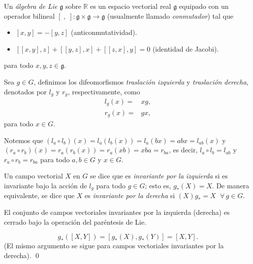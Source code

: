 \begin{mydef}
Un \emph{\'{a}lgebra de Lie} $\mathfrak{g}$ sobre $\mathbb{R}$ es un espacio vectorial real $\mathfrak{g}$ equipado con un operador bilineal $[\;, \;]: \mathfrak{g} \times \mathfrak{g} \rightarrow \mathfrak{g}$ (usualmente llamado \emph{conmutador}) tal que
%
\begin{itemize}
\item{$[x, y] = -[y, z]$ (anticonmutatividad).}
\item{$[[x, y], z] + [[y, z], x] + [[z, x], y] = 0$ (identidad de Jacobi).}
\end{itemize}
%
para todo $x, y, z \in \mathfrak{g}$.
\end{mydef}

\begin{mydef}
Sea $g \in G$, definimos los difeomorfismos \emph{traslaci\'{o}n izquierda} y \emph{traslaci\'{o}n derecha}, denotados por $l_{g}$ y $r_{g}$, respectivamente, como
%
\begin{align*}
l_{g} (x) = & x g, \\
r_{g} (x) = & g x,
\end{align*}
%
para todo $x \in G$.
\end{mydef}

\begin{obs}
Notemos que  $(l_{a} \circ l_{b}) (x) = l_{a} (l_{b} (x)) = l_{a} (bx) = abx = l_{ab} (x)$ y $(r_{a} \circ r_{b}) (x) = r_{a} (r_{b} (x)) = r_{a} (xb) = xba = r_{ba}$, es decir, $l_{a} \circ l_{b} = l_{ab}$ y $r_{a} \circ r_{b} = r_{ba}$ para todo $a, b \in G$ y $x \in G$.
\end{obs}

\begin{mydef}
Un campo vectorial $X$ en $G$ se dice que es \emph{invariante por la izquierda} si es invariante bajo la acci\'{o}n de $l_{g}$ para todo $g \in G$; esto es, $g_{*} (X) = X$. De manera equivalente, se dice que $X$ es \emph{invariante por la derecha} si $(X)g_{*} = X$ $\; \forall \, g \in G$.
\end{mydef}

\begin{thm}
El conjunto de campos vectoriales invariantes por la izquierda (derecha) es cerrado bajo la operaci\'{o}n del par\'{e}ntesis de Lie.
\end{thm}
%
\begin{dem}
$$g_{*} ([X, Y]) = [g_{*} (X), g_{*} (Y)] = [X, Y].$$ (El mismo argumento se sigue para campos vectoriales invariantes por la derecha). \qed
\end{dem}

